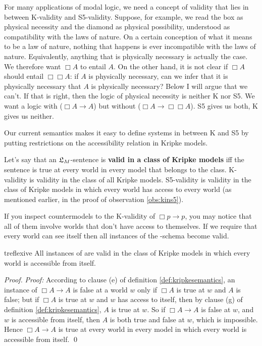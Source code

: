 For many applications of modal logic, we need a concept of validity that lies in
between K-validity and S5-validity. Suppose, for example, we read the box as
physical necessity and the diamond as physical possibility, understood as
compatibility with the laws of nature. On a certain conception of what it means
to be a law of nature, nothing that happens is ever incompatible with the laws
of nature. Equivalently, anything that is physically necessary is actually the
case. We therefore want $\Box A$ to entail $A$. On the other hand, it is not
clear if $\Box A$ should entail $\Box\Box A$: if $A$ is physically necessary,
can we infer that it is physically necessary that $A$ is physically necessary?
Below I will argue that we can't. If that is right, then the logic of physical
necessity is neither K nor S5. We want a logic with  ($\Box A \to A$)
but without  ($\Box A \to \Box\Box A$). S5 gives us both, K gives us
neither.

Our current semantics makes it easy to define systems in between K and S5 by
putting restrictions on the accessibility relation in Kripke models.

Let's say that an $\mathfrak{L}_M$-sentence is \textbf{valid in a class of Kripke models}
iff the sentence is true at every world in every model that belongs to the
class. K-validity is validity in the class of all Kripke models. S5-validity is
validity in the class of Kripke models in which every world has access to every
world (as mentioned earlier, in the proof of observation \ref{obs:kins5}).


If you inspect countermodels to the K-validity of $\Box p \to p$, you may notice
that all of them involve worlds that don't have access to themselves. If we
require that every world can see itself then all instances of the -schema
become valid.

\begin{observation}{treflexive}
  All instances of  are valid in the class of Kripke models in which every
  world is accessible from itself.
\end{observation}
%
\begin{proof}
  \emph{Proof:} According to clause (e) of definition \ref{def:kripkesemantics},
  an instance of $\Box A \to A$ is false at a world $w$ only if $\Box A$ is true
  at $w$ and $A$ is false; but if $\Box A$ is true at $w$ and $w$ has access to
  itself, then by clause (g) of definition \ref{def:kripkesemantics}, $A$ is
  true at $w$. So if $\Box A \to A$ is false at $w$, and $w$ is accessible from
  itself, then $A$ is both true and false at $w$, which is impossible. Hence
  $\Box A \to A$ is true at every world in every model in which every world is
  accessible from itself. \qed
\end{proof}


